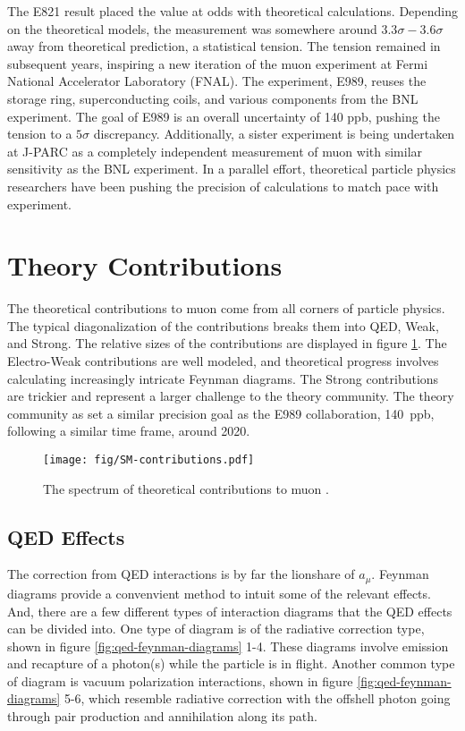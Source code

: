 The E821 \gmtwo result placed the value at odds with theoretical calculations.  Depending on the theoretical models, the measurement was somewhere around $3.3\sigma - 3.6\sigma$ away from theoretical prediction, a statistical tension.  The tension remained in subsequent years, inspiring a new iteration of the muon \gmtwo experiment at Fermi National Accelerator Laboratory (FNAL). The experiment, E989, reuses the storage ring, superconducting coils, and various components from the BNL experiment.  The goal of E989 is an overall uncertainty of 140 ppb, pushing the tension to a $5\sigma$ discrepancy. Additionally, a sister experiment is being undertaken at J-PARC as a completely independent measurement of muon \gmtwo with similar sensitivity as the BNL experiment.  In a parallel effort, theoretical particle physics researchers have been pushing the precision of calculations to match pace with experiment.

\section{Theory Contributions}

The theoretical contributions to muon \gmtwo come from all corners of particle physics.  The typical diagonalization of the contributions breaks them into QED, Weak, and Strong. The relative sizes of the contributions are displayed in figure \ref{fig:sm-contributions}. The Electro-Weak contributions are well modeled, and theoretical progress involves calculating increasingly intricate Feynman diagrams.  The Strong contributions are trickier and represent a larger challenge to the theory community.  The theory community as set a similar precision goal as the E989 collaboration, \SI{140}{ppb}, following a similar time frame, around 2020.


\begin{figure}
\texttt{[image: fig/SM-contributions.pdf]}
\label{fig:sm-contributions}
\caption{The spectrum of theoretical contributions to muon \gmtwo.}
\end{figure}

\subsection{QED Effects} \label{sec:theory-qed}

The correction from QED interactions is by far the lionshare of $a_\mu$.  Feynman diagrams provide a convenvient method to intuit some of the relevant effects.  And, there are a few different types of interaction diagrams that the QED effects can be divided into.  One type of diagram is of the radiative correction type, shown in figure \ref{fig:qed-feynman-diagrams} 1-4.  These diagrams involve emission and recapture of a photon(s) while the particle is in flight.  Another common type of diagram is vacuum polarization interactions, shown in figure \ref{fig:qed-feynman-diagrams} 5-6, which resemble radiative correction with the offshell photon going through pair production and annihilation along its path.

